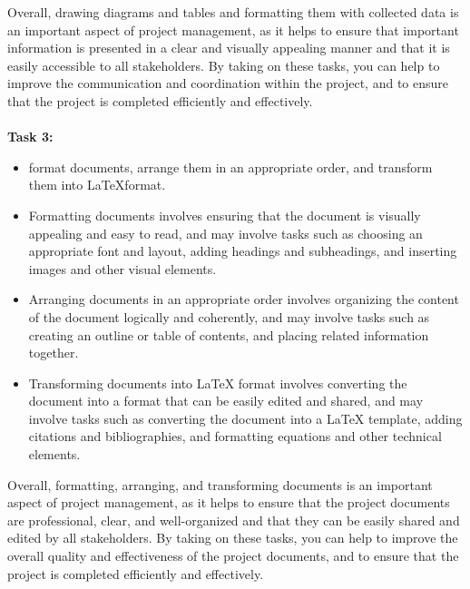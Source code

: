 \documentclass[12pt]{article}
\begin{document}
						Overall, drawing diagrams and tables and formatting them with collected data is an important aspect of project management, as it helps to ensure that important information is presented in a clear and visually appealing manner and that it is easily accessible to all stakeholders. By taking on these tasks, you can help to improve the communication and coordination within the project, and to ensure that the project is completed efficiently and effectively.\\
				\\
				\textbf{Task 3:} 
				\begin{itemize}
					\item format documents, arrange them in an appropriate order, and transform them into  \LaTeX\quad format.
					\item Formatting documents involves ensuring that the document is visually appealing and easy to read, and may involve tasks such as choosing an appropriate font and layout, adding headings and subheadings, and inserting images and other visual elements.
					\item Arranging documents in an appropriate order involves organizing the content of the document logically and coherently, and may involve tasks such as creating an outline or table of contents, and placing related information together.
					\item Transforming documents into LaTeX format involves converting the document into a format that can be easily edited and shared, and may involve tasks such as converting the document into a LaTeX template, adding citations and bibliographies, and formatting equations and other technical elements.
				\end{itemize}
			
					Overall, formatting, arranging, and transforming documents is an important aspect of project management, as it helps to ensure that the project documents are professional, clear, and well-organized and that they can be easily shared and edited by all stakeholders. By taking on these tasks, you can help to improve the overall quality and effectiveness of the project documents, and to ensure that the project is completed efficiently and effectively.
				
\end{document}
